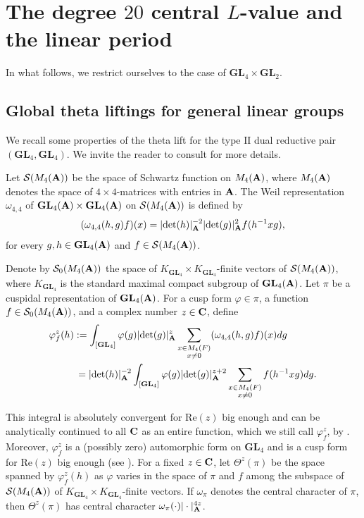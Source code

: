 \documentclass[11pt, reqno]{amsart}
\theoremstyle{plain}
\theoremstyle{definition}
\theoremstyle{remark}
\theoremstyle{plain}
\def\C{{\bf C}}
\def\A{{\bf A}}
\def\det{\mathrm{det}}
\def\GL{\mathbf{GL}}
\begin{document}
\section{The degree $20$ central $L$-value and the linear period}\label{sec:SVvsLcentral}

In what follows, we restrict ourselves to the case of $\GL_4 \times \GL_2$.


\subsection{Global theta liftings for general linear groups}
We recall some properties of the theta lift for the type $\mathrm{II}$ dual reductive pair $(\GL_4 ,\GL_4)$. We invite the reader to consult \cite{Watanabe:Global:Theta} for more details. 

Let $\mathcal{S}(M_4(\A))$  be the space of Schwartz function on $M_4(\A)$, where $M_4(\A)$ denotes the space of $4\times 4$-matrices with entries in $\A$. The Weil representation $\omega_{4,4}$ of  $\GL_4 (\A)\times \GL_4(\A)$ on $\mathcal{S}(M_4(\A))$ is defined by $$(\omega_{4,4}(h,g)f)(x) = | {\rm det}(h)|_\A^{-2} |{\rm det}(g)|_\A^2 f(h^{-1} x g),$$ for every $g,h \in \GL_4(\A)$ and $f \in \mathcal{S}(M_4(\A))$.

Denote by $\mathcal{S}_0(M_4(\A))$ the space of  $K_{\GL_4}\times K_{\GL_4}$-finite vectors of $\mathcal{S}(M_4(\A))$, where $K_{\GL_4}$ is the standard maximal compact subgroup of $\GL_4(\A)$.
Let $\pi$ be a cuspidal representation of $\GL_4(\A)$. For a cusp form $\varphi\in\pi$, a function $f\in \mathcal{S}_0(M_4(\A))$, and a complex number $z\in \C$, define
\begin{align} \varphi^z_f(h) &:= \int_{[\GL_4]}\varphi(g)|\det(g)|^{z}_{\A}\sum_{\substack{x\in M_4(F)\\x\neq 0}}(\omega_{4,4}(h,g)f)(x)dg \nonumber \\
&\,=|\det(h)|^{-2}_{\A}\int_{[\GL_4]}\varphi(g)|\det(g)|^{z+2}_{\A}\sum_{\substack{x\in M_4(F)\\x\neq 0}}f(h^{-1}xg)dg. \label{Theta:Lift:Expression}
\end{align}

\noindent This integral is absolutely convergent for $\mathrm{Re}(z)$ big enough and can be analytically continued to all $\C$ as an entire function, which we still call $\varphi^z_f$, by \cite[Lemma 3]{Watanabe:Global:Theta}. Moreover, $\varphi^z_f$ is a (possibly zero) automorphic form on $\GL_4$ and is a cusp form for $\mathrm{Re}(z)$ big enough (see \cite[p. 707]{Watanabe:Global:Theta}).
For a fixed $z \in \C$, let $\Theta^z(\pi)$ be the space spanned by $\varphi^z_f(h)$ as $\varphi$ varies in the space of $\pi$ and $f$ among the subspace of $\mathcal{S}(M_4(\A))$ of $K_{\GL_4}\times K_{\GL_4}$-finite vectors. If $\omega_\pi$ denotes the central character of $\pi$, then $\Theta^z(\pi)$ has central character $\omega_\pi(\cdot)| \cdot |^{4z}_\A$. 
\end{document}
